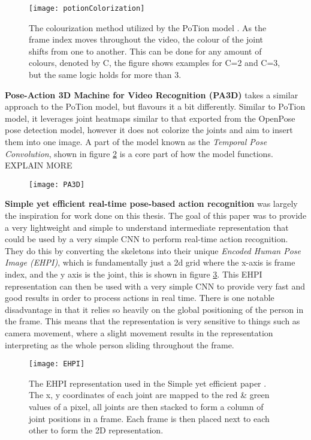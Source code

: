 \begin{figure}[h]
	\texttt{[image: potionColorization]}
	\centering
	\caption{The colourization method utilized by the PoTion model \cite{potion}. As the frame index moves throughout the video, the colour of the joint shifts from one to another. This can be done for any amount of colours, denoted by C, the figure shows examples for C=2 and C=3, but the same logic holds for more than 3.}
	\label{fig:potion-colourization}
\end{figure}

\textbf{Pose-Action 3D Machine for Video Recognition (PA3D)} \cite{PA3D} takes a similar approach to the PoTion model, but flavours it a bit differently. Similar to PoTion model, it leverages joint heatmaps similar to that exported from the OpenPose pose detection model, however it does not colorize the joints and aim to insert them into one image. A part of the model known as the \textit{Temporal Pose Convolution}, shown in figure \ref{fig:PA3D} is a core part of how the model functions. EXPLAIN MORE

\begin{figure}[h]
	\texttt{[image: PA3D]}
	\centering
	\caption{}
	\label{fig:PA3D}
\end{figure}

\textbf{Simple yet efficient real-time pose-based action recognition} \cite{simple_yet_efficient} was largely the inspiration for work done on this thesis. The goal of this paper was to provide a very lightweight and simple to understand intermediate representation that could be used by a very simple CNN to perform real-time action recognition. They do this by converting the skeletons into their unique \textit{Encoded Human Pose Image (EHPI)}, which is fundamentally just a 2d grid where the x-axis is frame index, and the y axis is the joint, this is shown in figure \ref{fig:EHPI}. This EHPI representation can then be used with a very simple CNN to provide very fast and good results in order to process actions in real time. There is one notable disadvantage in that it relies so heavily on the global positioning of the person in the frame. This means that the representation is very sensitive to things such as camera movement, where a slight movement results in the representation interpreting as the whole person sliding throughout the frame.

\begin{figure}[h]
	\texttt{[image: EHPI]}
	\centering
	\caption{The EHPI representation used in the Simple yet efficient paper \cite{simple_yet_efficient}. The x, y coordinates of each joint are mapped to the red \& green values of a pixel, all joints are then stacked to form a column of joint positions in a frame. Each frame is then placed next to each other to form the 2D representation.}
	\label{fig:EHPI}
\end{figure}